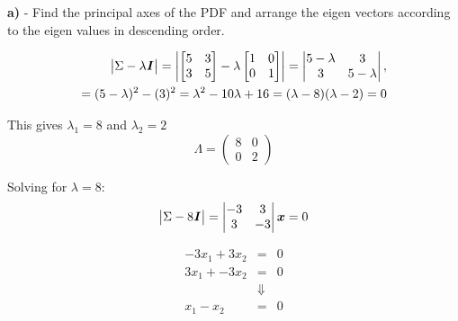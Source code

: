 \documentclass{homeworg}
\begin{document}
\textbf{a)} - Find the principal axes of the PDF and arrange the eigen vectors 
according to the eigen values in descending order.
\smallskip

\begin{equation}
    \begin{aligned}
        \begin{vmatrix}
            \Sigma - \lambda \textbf{\textit{I}}
        \end{vmatrix}
        =
        \begin{vmatrix}
            \begin{bmatrix}
                5 &3 
                \\ 
                3 & 5
            \end{bmatrix} -
            \lambda
            \begin{bmatrix}
                1 & 0  
                \\ 
                0 & 1
            \end{bmatrix}
        \end{vmatrix}
        =
        \begin{vmatrix}
            5-\lambda&3 \\ 
            3& 5-\lambda
        \end{vmatrix}, \\
        = (5-\lambda)^2-(3)^2
        = \lambda^2-10\lambda+16
        = (\lambda-8)(\lambda-2) = 0
    \end{aligned}
\end{equation}

This gives $\lambda_1 = 8$ and $\lambda_2 = 2$
\begin{equation}
    \Lambda = 
    \begin{pmatrix}
        8&0 \\ 
        0&2
    \end{pmatrix}
\end{equation}

Solving for $\lambda = 8$:
\begin{equation}
    \begin{vmatrix}
        \Sigma - 8\textbf{\textit{I}}
    \end{vmatrix}
    = 
    \begin{vmatrix}
        -3 & 3 \\
        3 & -3
    \end{vmatrix}\bm{x}
    = 0
\end{equation}

\begin{equation}
    \begin{matrix}
        -3x_1 + 3x_2& =& 0 \\ 
        3x_1 + -3x_2&=& 0 \\
        & \Downarrow & \\
        x_1 - x_2 &=& 0
    \end{matrix}
\end{equation}
\end{document}
